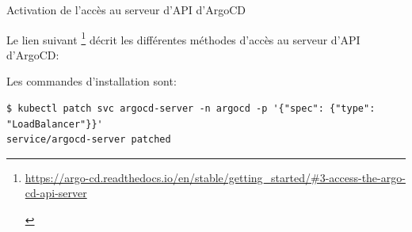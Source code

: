 \begin{frame}[fragile]{Activation de l'accès au serveur d'API d'ArgoCD}

   Le lien suivant \footnote{
      \begin{tcolorbox}
      \tiny{\url{https://argo-cd.readthedocs.io/en/stable/getting_started/\#3-access-the-argo-cd-api-server}}
      \end{tcolorbox}
   }
   décrit les différentes méthodes d'accès au serveur d'API d'ArgoCD:

   Les commandes d'installation sont:\\
\begin{tiny}
\begin{Verbatim}[commandchars=\&\#\#]
$ kubectl patch svc argocd-server -n argocd -p '{"spec": {"type": "LoadBalancer"}}'
service/argocd-server patched
\end{Verbatim}
\end{tiny}

\end{frame}



